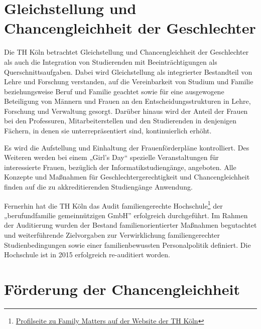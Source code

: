 \section{Gleichstellung und Chancengleichheit der
Geschlechter\label{/mi-2017/selbstbericht/1100-geschlechtergerechtigkeit-und-chancengleichheit/0000-geschlechtergerechtigkeit-und-chancengleichheit}}\label{gleichstellung-und-chancengleichheit-der-geschlechterpathlabelmi-2017selbstbericht1100-geschlechtergerechtigkeit-und-chancengleichheit0000-geschlechtergerechtigkeit-und-chancengleichheit}

Die TH Köln betrachtet Gleichstellung und Chancengleichheit der
Geschlechter als auch die Integration von Studierenden mit
Beeinträchtigungen als Querschnittsaufgaben. Dabei wird Gleichstellung
als integrierter Bestandteil von Lehre und Forschung verstanden, auf die
Vereinbarkeit von Studium und Familie beziehungsweise Beruf und Familie
geachtet sowie für eine ausgewogene Beteiligung von Männern und Frauen
an den Entscheidungsstrukturen in Lehre, Forschung und Verwaltung
gesorgt. Darüber hinaus wird der Anteil der Frauen bei den Professuren,
Mitarbeiterstellen und den Studierenden in denjenigen Fächern, in denen
sie unterrepräsentiert sind, kontinuierlich erhöht.

Es wird die Aufstellung und Einhaltung der Frauenförderpläne
kontrolliert. Des Weiteren werden bei einem „Girl's Day`` spezielle
Veranstaltungen für interessierte Frauen, bezüglich der
Informatikstudiengänge, angeboten. Alle Konzepte und Maßnahmen für
Geschlechtergerechtigkeit und Chancengleichheit finden auf die zu
akkreditierenden Studiengänge Anwendung.

Fernerhin hat die TH Köln das Audit familiengerechte
Hochschule\footnote{\href{https://www.th-koeln.de/hochschule/familienfreundlichkeit_3759.php}{Profilseite
  zu Family Matters auf der Website der TH Köln}} der „berufundfamilie
gemeinnützigen GmbH'' erfolgreich durchgeführt. Im Rahmen der
Auditierung wurden der Bestand familienorientierter Maßnahmen
begutachtet und weiterführende Zielvorgaben zur Verwirklichung
familiengerechter Studienbedingungen sowie einer familienbewussten
Personalpolitik definiert. Die Hochschule ist in 2015 erfolgreich
re-auditiert worden.

\section{Förderung der
Chancengleichheit\label{/mi-2017/selbstbericht/1100-geschlechtergerechtigkeit-und-chancengleichheit/0000-geschlechtergerechtigkeit-und-chancengleichheit}}\label{fuxf6rderung-der-chancengleichheitpathlabelmi-2017selbstbericht1100-geschlechtergerechtigkeit-und-chancengleichheit0000-geschlechtergerechtigkeit-und-chancengleichheit}

